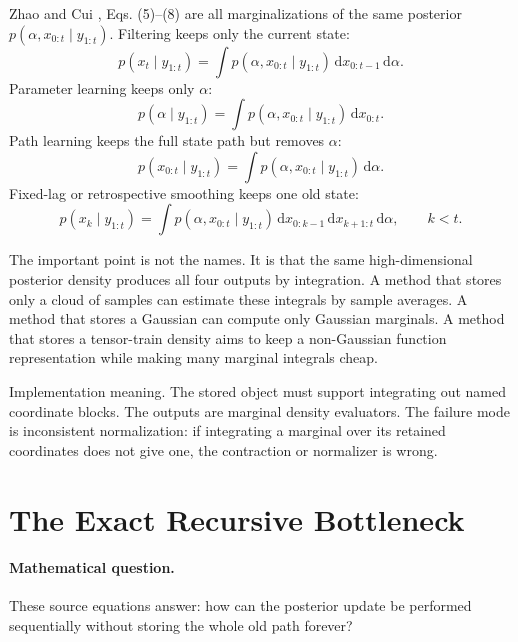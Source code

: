 \documentclass[11pt]{article}
\numberwithin{equation}{section}
\newcommand{\dd}{\,\mathrm d}
\begin{document}
Zhao and Cui \cite{zhao2024ttsequential}, Eqs. (5)--(8) are all marginalizations of the same posterior
\(p(\alpha,x_{0:t}\mid y_{1:t})\).  Filtering keeps only the current state:
\begin{equation}
    p(x_t\mid y_{1:t})
    =
    \int p(\alpha,x_{0:t}\mid y_{1:t})
    \dd x_{0:t-1}\dd\alpha .
    \label{eq:p24-bf-5}
\end{equation}
Parameter learning keeps only \(\alpha\):
\begin{equation}
    p(\alpha\mid y_{1:t})
    =
    \int p(\alpha,x_{0:t}\mid y_{1:t})\dd x_{0:t}.
    \label{eq:p24-bf-6}
\end{equation}
Path learning keeps the full state path but removes \(\alpha\):
\begin{equation}
    p(x_{0:t}\mid y_{1:t})
    =
    \int p(\alpha,x_{0:t}\mid y_{1:t})\dd\alpha .
    \label{eq:p24-bf-7}
\end{equation}
Fixed-lag or retrospective smoothing keeps one old state:
\begin{equation}
    p(x_k\mid y_{1:t})
    =
    \int p(\alpha,x_{0:t}\mid y_{1:t})
    \dd x_{0:k-1}\dd x_{k+1:t}\dd\alpha ,
    \qquad k<t .
    \label{eq:p24-bf-8}
\end{equation}

The important point is not the names.  It is that the same high-dimensional
posterior density produces all four outputs by integration.  A method that
stores only a cloud of samples can estimate these integrals by sample averages.
A method that stores a Gaussian can compute only Gaussian marginals.  A method
that stores a tensor-train density aims to keep a non-Gaussian function
representation while making many marginal integrals cheap.

Implementation meaning. The stored object must support
integrating out named coordinate blocks.  The outputs are marginal density
evaluators.  The failure mode is inconsistent normalization: if integrating a
marginal over its retained coordinates does not give one, the contraction or
normalizer is wrong.

\section{The Exact Recursive Bottleneck}

\paragraph{Mathematical question.}
These source equations answer: how can the posterior update be performed
sequentially without storing the whole old path forever?
\end{document}

